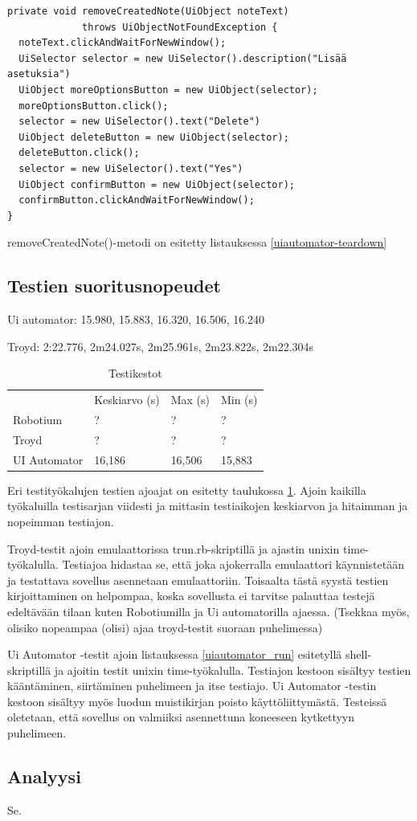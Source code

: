 \begin{lstlisting}[float, label=uiautomator_teardown,caption=Luodun muistikirjan poisto ui automatorilla] 
private void removeCreatedNote(UiObject noteText) 
             throws UiObjectNotFoundException {
  noteText.clickAndWaitForNewWindow();
  UiSelector selector = new UiSelector().description("Lisää asetuksia")
  UiObject moreOptionsButton = new UiObject(selector);
  moreOptionsButton.click();
  selector = new UiSelector().text("Delete")
  UiObject deleteButton = new UiObject(selector);
  deleteButton.click();
  selector = new UiSelector().text("Yes")
  UiObject confirmButton = new UiObject(selector);
  confirmButton.clickAndWaitForNewWindow();
}
\end{lstlisting}

removeCreatedNote()-metodi on esitetty listauksessa \ref{uiautomator-teardown}

\subsection{Testien suoritusnopeudet}

Ui automator: 15.980, 15.883, 16.320, 16.506, 16.240

Troyd: 2:22.776, 2m24.027s, 2m25.961s, 2m23.822s, 2m22.304s

\begin{table}[h]
\centering
\begin{tabular}{ l l l l }
   & Keskiarvo (s) & Max (s) & Min (s) \\
  Robotium & ? & ? & ? \\
  Troyd & ? & ? & ? \\
  UI Automator & 16,186 & 16,506 & 15,883 \\
\end{tabular}
\caption{Testikestot}
\label{uitest_timing}
\end{table}

Eri testityökalujen testien ajoajat on esitetty taulukossa \ref{uitest_timing}. Ajoin kaikilla työkaluilla testisarjan viidesti ja mittasin testiaikojen keskiarvon ja hitaimman ja nopeimman testiajon.

Troyd-testit ajoin emulaattorissa trun.rb-skriptillä ja ajastin unixin time-työkalulla. Testiajoa hidastaa se, että joka ajokerralla emulaattori käynnistetään ja testattava sovellus asennetaan emulaattoriin. Toisaalta tästä syystä testien kirjoittaminen on helpompaa, koska sovellusta ei tarvitse palauttaa testejä edeltävään tilaan kuten Robotiumilla ja Ui automatorilla ajaessa. (Tsekkaa myös, olisiko nopeampaa (olisi) ajaa troyd-testit suoraan puhelimessa)

Ui Automator -testit ajoin listauksessa \ref{uiautomator_run} esitetyllä shell-skriptillä ja ajoitin testit unixin time-työkalulla. Testiajon kestoon sisältyy testien kääntäminen, siirtäminen puhelimeen ja itse testiajo. Ui Automator -testin kestoon sisältyy myös luodun muistikirjan poisto käyttöliittymästä. Testeissä oletetaan, että sovellus on valmiiksi asennettuna koneeseen kytkettyyn puhelimeen.

\subsection{Analyysi}

Se.
